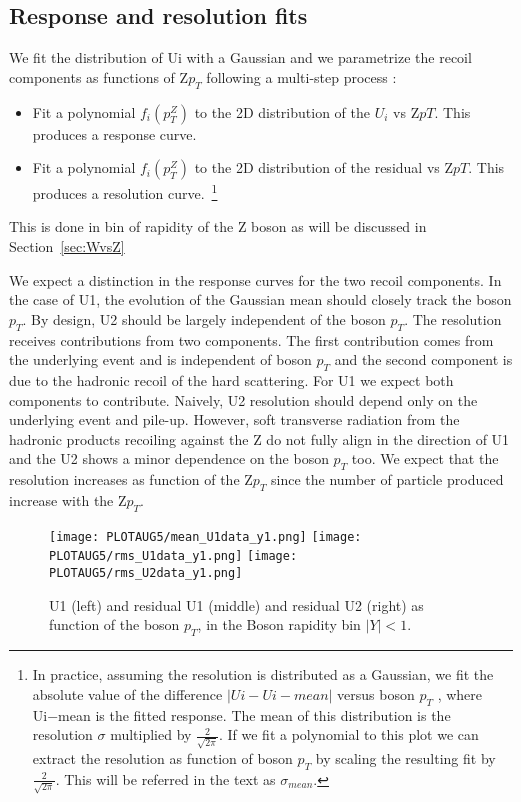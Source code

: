 \documentclass[41pt,a4paper,oneside]{report}
\begin{document}
\subsection{Response and resolution fits}
\label{sec:Fits}
We fit the distribution of Ui with a Gaussian and we parametrize the recoil components as functions of Z$p_{T}$ following a multi-step process :
\begin{itemize}
\item Fit a polynomial $f_{i}(p^{Z}_{T})$ to the 2D distribution of the $U_{i}$ vs Z$p{T}$. This produces a response curve.
\item Fit a polynomial $f_{i}(p^{Z}_{T})$ to the 2D distribution of the residual vs Z$p{T}$. This produces a resolution curve.~\footnote{
In practice, assuming the resolution is distributed as a Gaussian, we fit the absolute value of the difference $|Ui − Ui−mean|$ versus boson $p_{T}$ , 
where Ui−mean is the fitted response.
The mean of this distribution is the resolution $\sigma$ multiplied by $\frac{2}{\sqrt{2\pi}}$. If we fit a polynomial to this plot we can extract 
the resolution as function of boson $p_{T}$ by scaling the resulting fit by $\frac{2}{\sqrt{2\pi}}$. This will be referred in the text as $\sigma_{mean}$.
}
\end{itemize}
This is done in bin of rapidity of the Z boson as will be discussed in Section~\ref{sec:WvsZ}

We expect a distinction in the response curves for the two recoil components. In the case of U1, the evolution of
the Gaussian mean should closely track the boson $p_{T}$. By design, U2 should be largely independent of the boson $p_{T}$. 
The resolution receives contributions from two components. The first contribution comes from the underlying event
and is independent of boson $p_{T}$ and the second component is due to the hadronic recoil of the hard scattering. 
For U1 we expect both components to contribute. Naively, U2 resolution should depend only on the underlying event and pile-up. 
However, soft transverse radiation from the hadronic products recoiling against the Z do not fully align in the direction of U1 
and the U2 shows a minor dependence on the boson $p_{T}$ too.
We expect that the resolution increases as function of the Z$p_{T}$ since the number of particle produced increase with the Z$p_{T}$.

\begin{figure}[h!]
  \begin{center}
    \texttt{[image: PLOTAUG5/mean\_U1data\_y1.png]}
    \texttt{[image: PLOTAUG5/rms\_U1data\_y1.png]}
    \texttt{[image: PLOTAUG5/rms\_U2data\_y1.png]}
    \caption{U1 (left) and residual U1 (middle) and residual U2 (right) as function of the boson $p_{T}$, in the Boson rapidity bin $|Y|<1$.{\color{blue}{plot oder than OCT6}}}
    \label{fig:UNBINNEDdata}
  \end{center}
\end{figure}
\end{document}
